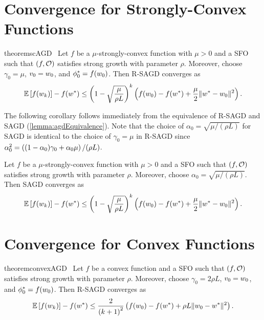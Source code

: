 \section{Convergence for Strongly-Convex Functions}\label{sec:agd-sc}

\begin{restatable}{theorem}{scAGD}~\label{thm:sc-agd}
    Let \( f \) be a \( \mu \)-strongly-convex function with \( \mu > 0 \) and \oracle{} a SFO such that \( \rbr{f, \oracle{}} \) satisfies strong growth with parameter \( \rho \).
    Moreover, choose \( \gamma_0 = \mu \), \( v_0 = \w_0 \), and \( \phi_0^* = f(\w_0) \).
    Then R-SAGD converges as  
    \[ \E\sbr{f(\wk)} - f(\wopt) \leq \rbr{1 - \sqrt{\frac{\mu}{\rho L}}}^{k} \rbr{ f(w_0) - f(\wopt) + \frac{\mu}{2} \norm{\wopt - \w_0}^2 }.  \]
\end{restatable}

The following corollary follows immediately from the equivalence of R-SAGD and SAGD (\autoref{lemma:agdEquivalence}).
Note that the choice of \( \alpha_0 = \sqrt{\mu / (\rho L)} \) for SAGD is identical to the choice of \( \gamma_0 = \mu \) in R-SAGD since \( \alpha_0^2 = \rbr{(1 - \alpha_0)\gamma_0 + \alpha_0 \mu} / (\rho L) \).

\begin{corollary}
    Let \( f \) be a \( \mu \)-strongly-convex function with \( \mu > 0 \) and \oracle{} a SFO such that \( \rbr{f, \oracle{}} \) satisfies strong growth with parameter \( \rho \).
    Moreover, choose \( \alpha_0 = \sqrt{\mu / (\rho L)} \). 
    Then SAGD converges as  
    \[ \E\sbr{f(\wk)} - f(\wopt) \leq \rbr{1 - \sqrt{\frac{\mu}{\rho L}}}^{k} \rbr{ f(w_0) - f(\wopt) + \frac{\mu}{2} \norm{\wopt - \w_0}^2 }.  \]
\end{corollary}


\section{Convergence for Convex Functions}\label{sec:agd-convex}

\begin{restatable}{theorem}{convexAGD}~\label{thm:sc-agd}
    Let \( f \) be a convex function and \oracle{} a SFO such that \( \rbr{f, \oracle{}} \) satisfies strong growth with parameter \( \rho \).
    Moreover, choose \( \gamma_0 = 2 \rho L \), \( v_0 = \w_0 \), and \( \phi_0^* = f(\w_0) \).
    Then R-SAGD converges as  
    \[ \E\sbr{f(\wk)} - f(\wopt) \leq \frac{2}{\rbr{k+1}^2}\rbr{f(\w_0) - f(\wopt) + \rho L \norm{\w_0 - \wopt}^2 }. \]
\end{restatable}

